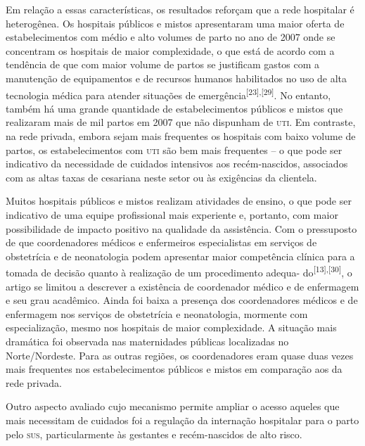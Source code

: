 \documentclass{article}
\begin{document}
Em relação a essas características, os resultados reforçam que a rede hospitalar
é
heterogênea. Os hospitais públicos e mistos apresentaram uma maior oferta de
estabelecimentos com médio e alto volumes de parto no ano de 2007 onde se
concentram
os hospitais de maior complexidade, o que está de acordo com a tendência de que
com
maior volume de partos se justificam gastos com a manutenção de equipamentos e
de
recursos humanos habilitados no uso de alta tecnologia médica para atender
situações
de emergência\textsuperscript{[}\textsuperscript{23}\textsuperscript{]}\textsuperscript{,}\textsuperscript{[}\textsuperscript{29}\textsuperscript{]}. No entanto, também há uma grande
quantidade de estabelecimentos públicos e mistos que realizaram mais de mil
partos
em 2007 que não dispunham de \textsc{uti}. Em contraste, na rede privada, embora sejam
mais
frequentes os hospitais com baixo volume de partos, os estabelecimentos com \textsc{uti}
são
bem mais frequentes – o que pode ser indicativo da necessidade de cuidados
intensivos aos recém-nascidos, associados com as altas taxas de cesariana neste
setor ou às exigências da clientela.

Muitos hospitais públicos e mistos realizam atividades de ensino, o que pode ser
indicativo de uma equipe profissional mais experiente e, portanto, com maior
possibilidade de impacto positivo na qualidade da assistência. Com o pressuposto
de
que coordenadores médicos e enfermeiros especialistas em serviços de obstetrícia
e
de neonatologia podem apresentar maior competência clínica para a tomada de
decisão
quanto à realização de um procedimento adequa- do\textsuperscript{[}\textsuperscript{13}\textsuperscript{]}\textsuperscript{,}\textsuperscript{[}\textsuperscript{30}\textsuperscript{]}, o artigo se limitou a descrever a existência de
coordenador médico e de enfermagem e seu grau acadêmico. Ainda foi baixa a
presença
dos coordenadores médicos e de enfermagem nos serviços de obstetrícia e
neonatologia, mormente com especialização, mesmo nos hospitais de maior
complexidade. A situação mais dramática foi observada nas maternidades públicas
localizadas no Norte/Nordeste. Para as outras regiões, os coordenadores eram
quase
duas vezes mais frequentes nos estabelecimentos públicos e mistos em comparação
aos
da rede privada.

Outro aspecto avaliado cujo mecanismo permite ampliar o acesso aqueles que mais
necessitam de cuidados foi a regulação da internação hospitalar para o parto
pelo
\textsc{sus}, particularmente às gestantes e recém-nascidos de alto risco.
\end{document}
